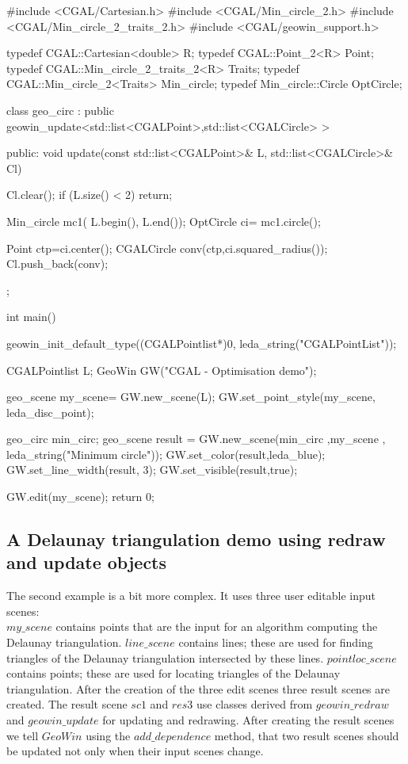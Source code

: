 \begin{cprog}
#include <CGAL/Cartesian.h>
#include <CGAL/Min_circle_2.h>
#include <CGAL/Min_circle_2_traits_2.h>
#include <CGAL/geowin_support.h>

typedef  CGAL::Cartesian<double>         R;
typedef  CGAL::Point_2<R>                Point;
typedef  CGAL::Min_circle_2_traits_2<R>  Traits;
typedef  CGAL::Min_circle_2<Traits>      Min_circle;
typedef  Min_circle::Circle              OptCircle;

class geo_circ : public geowin_update<std::list<CGALPoint>,std::list<CGALCircle> >
{
public:
 void update(const std::list<CGALPoint>& L, std::list<CGALCircle>& Cl)
 {
   Cl.clear();
   if (L.size() < 2) return;

   Min_circle  mc1( L.begin(), L.end());
   OptCircle ci= mc1.circle();

   Point ctp=ci.center();
   CGALCircle conv(ctp,ci.squared_radius());
   Cl.push_back(conv); 
 }
};

int main()
{
  geowin_init_default_type((CGALPointlist*)0, leda_string("CGALPointList"));

  CGALPointlist L;
  GeoWin GW("CGAL - Optimisation demo");

  geo_scene my_scene= GW.new_scene(L);  
  GW.set_point_style(my_scene, leda_disc_point);
  
  geo_circ min_circ;
  geo_scene result  = GW.new_scene(min_circ ,my_scene , 
                                   leda_string("Minimum circle"));
  GW.set_color(result,leda_blue);
  GW.set_line_width(result, 3);
  GW.set_visible(result,true);

  GW.edit(my_scene);
  return 0;
}
\end{cprog}

\subsection{A Delaunay triangulation demo using redraw and update objects}

The second example is a bit more complex. It uses three user editable input scenes:\\
$my\_scene$ contains points that are the input for an algorithm computing the
Delaunay triangulation.
$line\_scene$ contains lines; these are used for finding triangles of the Delaunay
triangulation intersected by these lines.
$pointloc\_scene$ contains points; these are used for locating triangles of the Delaunay
triangulation.
After the creation of the three edit scenes three result scenes are created. The result scene
$sc1$ and $res3$ use classes derived from $geowin\_redraw$ and $geowin\_update$ for
updating and redrawing.
After creating the result scenes we tell $GeoWin$ using the $add\_dependence$ method,
that two result scenes should be updated not only when their input scenes change.

